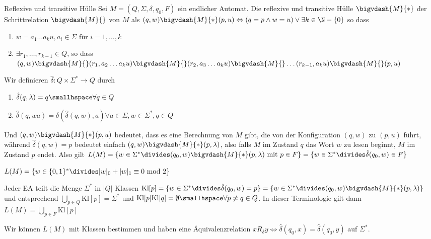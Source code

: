\begin{definition}[]{Reflexive und transitive Hülle}
    Sei $M = (Q, \Sigma, \delta, q_0, F)$ ein endlicher Automat. Die reflexive und transitive Hülle $\bigvdash{M}{*}$ der Schrittrelation $\bigvdash{M}{}$ von $M$ als
    $(q, w) \bigvdash{M}{*} (p, u) \Leftrightarrow (q = p \land w = u) \lor \exists k \in \N - \{ 0 \}$ so dass
    \begin{enumerate}[label=\textit{(\roman*)}]
        \item $w = a_1\ldots a_ku, a_i \in \Sigma$ für $i = 1, \ldots, k$
        \item $\exists r_1, \ldots, r_{k - 1} \in Q$, so dass
              $(q, w) \bigvdash{M}{} (r_1, a_2 \ldots a_k u) \bigvdash{M}{} (r_2, a_3 \ldots a_k u) \bigvdash{M}{} \ldots (r_{k - 1}, a_k u) \bigvdash{M}{} (p, u)$
    \end{enumerate}
    Wir definieren $\hat{\delta}: Q \times \Sigma^* \rightarrow Q$ durch
    \rmvspace
    \rmvspace
    \begin{multicols}{2}
        \begin{enumerate}[label=\textit{(\roman*)}]
            \item $\hat{\delta}(q, \lambda) = q \smallhspace \forall q \in Q$
            \item $\hat{\delta}(q, wa) = \delta(\hat{\delta}(q, w), a) \forall a \in \Sigma, w \in \Sigma^*, q \in Q$
        \end{enumerate}
    \end{multicols}
\end{definition}
Und $(q, w) \bigvdash{M}{*} (p, u)$ bedeutet, dass es eine Berechnung von $M$ gibt, die von der Konfiguration $(q, w)$ zu $(p, u)$ führt,
während $\hat{\delta}(q, w) = p$ bedeutet einfach $(q, w) \bigvdash{M}{*} (p, \lambda)$, also falls $M$ im Zustand $q$ das Wort $w$ zu lesen beginnt, $M$ im Zustand $p$ endet.
Also gilt $L(M) = \{ w \in \Sigma^* \divides (q_0, w) \bigvdash{M}{*} (p, \lambda) \text{ mit } p \in F \} = \{ w \in \Sigma^* \divides \hat{\delta}(q_0, w) \in F \}$

\inlinelemma $L(M) = \{ w \in \{ 0, 1 \}^* \divides |w|_0 + |w|_1 \equiv 0 \text{ mod } 2 \}$

Jeder EA teilt die Menge $\Sigma^*$ in $|Q|$ Klassen 
$\text{Kl}[p] = \{ w \in \Sigma^* \divides \hat{\delta}(q_0, w) = p \} = \{ w \in \Sigma^* \divides (q_0, w) \bigvdash{M}{*} (p, \lambda) \}$
und entsprechend $\bigcup_{p \in Q} \text{Kl}[p] = \Sigma^*$ und $\text{Kl}[p] \text{Kl}[q] = \emptyset \smallhspace \forall p \neq q \in Q$.
In dieser Terminologie gilt dann $L(M) = \bigcup_{p \in F} \text{Kl}[p]$

Wir können $L(M)$ mit Klassen bestimmen und haben eine Äquivalenzrelation $x R_\delta y \Leftrightarrow \hat{\delta}(q_0, x) = \hat{\delta}(q_0, y)$ auf $\Sigma^*$.

